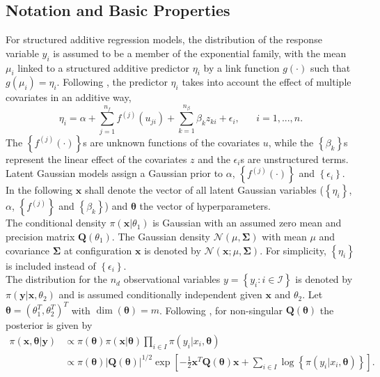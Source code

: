 \subsection{Notation and Basic Properties}
\label{sec:notation}
For structured additive regression models, the distribution of the response variable $y_i$ is assumed to be a member of the exponential family, with the mean $\mu_i$ linked to a structured additive predictor $\eta_i$ by a link function $g\left(\cdot\right)$ such that $g\left(\mu_i\right)=\eta_i$. Following \cite{stone1985additive}, the predictor $\eta_i$  takes into account the effect of multiple covariates in an additive way,
\begin{equation}\label{eq:predictor}
    \eta_i=\alpha+\sum_{j=1}^{n_f}f^{(j)}\left(u_{ji}\right)+\sum_{k=1}^{n_{\beta}}\beta_kz_{ki}+\epsilon_i, \hspace{20pt}i=1,...,n.
\end{equation}
The $\left\lbrace f^{(j)}\left(\cdot\right)\right\rbrace$s are unknown functions of the covariates $u$, while the $\left\lbrace\beta_k\right\rbrace$s represent the linear effect of the covariates $z$ and the $\epsilon_i$s are unstructured terms. Latent Gaussian models assign a Gaussian prior to $\alpha$, $\left\lbrace f^{(j)}\left(\cdot\right)\right\rbrace$ and $\left\lbrace\epsilon_i\right\rbrace$. In the following $\pmb{x}$ shall denote the vector of all latent Gaussian variables ($\left\lbrace\eta_i\right\rbrace$, $\alpha$, $\left\lbrace f^{(j)}\right\rbrace$ and $\left\lbrace\beta_k\right\rbrace$) and $\pmb{\theta}$ the vector of hyperparameters.\\
The conditional density $\pi\left(\pmb{x}|\theta_1\right)$ is Gaussian with an assumed zero mean and precision matrix $\pmb{Q}\left(\theta_1\right)$. The Gaussian density $\mathcal{N}\left(\mu,\pmb{\Sigma}\right)$ with mean $\mu$ and covariance $\pmb{\Sigma}$ at configuration $\pmb{x}$ is denoted by $\mathcal{N}\left(\pmb{x};\mu,\pmb{\Sigma}\right)$. For simplicity, $\left\lbrace\eta_i\right\rbrace$ is included instead of $\left\lbrace\epsilon_i\right\rbrace$. \\
The distribution for the $n_d$ observational variables $y=\left\lbrace y_i:i\in\mathcal{I}\right\rbrace$ is denoted by $\pi\left(\pmb{y}|\pmb{x}, \theta_2\right)$ and is assumed conditionally independent given $\pmb{x}$ and $\theta_2$. Let $\pmb{\theta}=\left(\theta_1^T,\theta_2^T\right)^T$ with $\dim\left(\pmb{\theta}\right)=m$. Following \cite{rue2009approximate}, for non-singular $\pmb{Q}\left(\pmb{\theta}\right)$ the posterior is given by
\begin{align}
    \pi\left(\pmb{x},\pmb{\theta}|\pmb{y}\right)&\propto\pi\left(\pmb{\theta}\right)\pi\left(\pmb{x}|\pmb{\theta}\right)\prod_{i\in I}\pi\left(y_i|x_i,\pmb{\theta}\right) \nonumber\\
    &\propto \pi\left(\pmb{\theta}\right)\left|\pmb{Q}\left(\pmb{\theta}\right)\right|^{1/2}\exp\left[-\frac{1}{2}\pmb{x}^T\pmb{Q}\left(\pmb{\theta}\right)\pmb{x}+\sum_{i\in I}\log\left\lbrace\pi\left(y_i|x_i,\pmb{\theta}\right)\right\rbrace\right].
\end{align}

